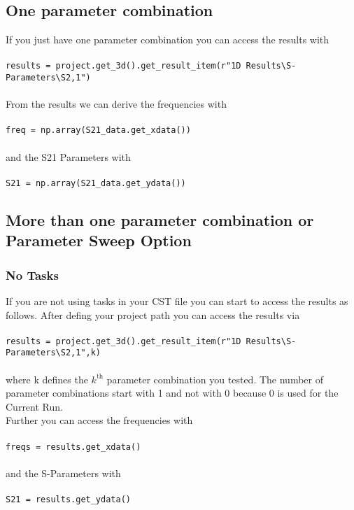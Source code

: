 \documentclass[12pt,accentcolor=tud2b, colorback, openany]{tudreport}
\begin{document}
	\subsection{One parameter combination}
	If you just have one parameter combination you can access the results with\\
	\\
	\texttt{results = project.get\_3d().get\_result\_item(r"1D Results\textbackslash S-Parameters\textbackslash S2,1")}\\
	\\
	From the results we can derive the frequencies with\\
	\\
	\texttt{freq = np.array(S21\_data.get\_xdata())}\\
	\\
	and the S21 Parameters with\\
	\\
	\texttt{S21 = np.array(S21\_data.get\_ydata())}\\
	\subsection{More than one parameter combination or Parameter Sweep Option}
	\subsubsection{No Tasks}
	If you are not using tasks in your CST file you can start to access the results as follows. After defing your project path you can access the results via\\
	\\	
	\texttt{results = project.get\_3d().get\_result\_item(r"1D Results\textbackslash S-Parameters\textbackslash S2,1",k)}\\
	\\
	where k defines the $k^{\text{th}}$ parameter combination you tested. The number of parameter combinations start with 1 and not with 0 because 0 is used for the Current Run.\\
	Further you can access the frequencies with\\
	\\
	\texttt{freqs = results.get\_xdata()}\\
	\\
	and the S-Parameters with\\
	\\
	\texttt{S21 = results.get\_ydata()}
\end{document}
